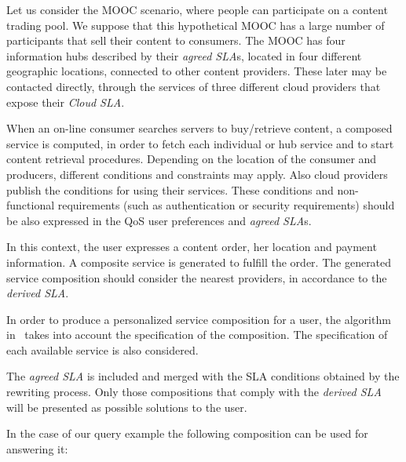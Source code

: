 Let us consider the MOOC scenario, where people can participate on a content trading pool.
We suppose that this hypothetical MOOC has a large number of participants that sell their content  to  consumers. 
The MOOC has four information hubs described by their {\em agreed SLA}s, located in four different geographic locations, connected to other content providers.
These later may be  contacted directly, through the services of three different cloud providers that expose their {\em Cloud SLA}.
 
  

When an on-line consumer searches servers to buy/retrieve content, a composed  service is computed, in order to fetch each individual or hub service and to start  content retrieval procedures.
Depending on the location of the consumer and producers, different conditions and constraints may apply.
Also  cloud providers  publish the conditions for using their services.
These conditions and non-functional requirements (such as authentication or security requirements) should  be also expressed in the QoS user preferences and {\em agreed SLA}s.

In this context, the user  expresses a content order, her location and payment information. A composite  service is  generated to fulfill the order.
The generated service composition should consider the nearest providers, in accordance to the {\em derived SLA}.

In order to produce a personalized service composition for a user, the algorithm in~\cite{CostaAMR13} takes into account the specification of the composition. The specification of each available service is also considered. 

 

The {\em agreed SLA} is included and merged with the SLA conditions obtained by the rewriting process. Only those compositions that comply with the {\em derived SLA} will be presented as possible solutions to the user.
 

In the case of our query example the following composition can be used for answering it:

